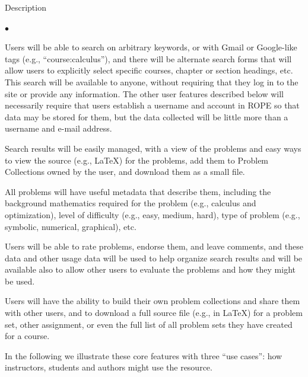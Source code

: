 \documentclass[11pt]{article}
\begin{document}
\begin{section}{Description}
\begin{list}{$\bullet$}{\setlength{\parsep}{0pt}\setlength{\itemsep}{0pt}}
  \item
    Users will be able to search on arbitrary keywords, or with Gmail or
    Google-like tags (e.g., ``course:calculus''), and there will be
    alternate search forms that will allow users to explicitly select
    specific courses, chapter or section headings, etc.  This search will
    be available to anyone, without requiring that they log in to the site
    or provide any information.  The other user features described below
    will necessarily require that users establish a username and account
    in ROPE so that data may be stored for them, but the data collected
    will be little more than a username and e-mail address.
  \item
    Search results will be easily managed, with a view of the problems and
    easy ways to view the source (e.g., \LaTeX) for the problems, add them
    to Problem Collections owned by the user, and download them as a small
    file.
  \item
    All problems will have useful metadata that describe them, including
    the background mathematics required for the problem (e.g., calculus
    and optimization), level of difficulty (e.g., easy, medium, hard),
    type of problem (e.g., symbolic, numerical, graphical), etc.
  \item
    Users will be able to rate problems, endorse them, and leave comments,
    and these data and other usage data will be used to help organize
    search results and will be available also to allow other users to
    evaluate the problems and how they might be used. 
  \item
    Users will have the ability to build their own problem collections and
    share them with other users, and to download a full source file (e.g.,
    in \LaTeX) for a problem set, other assignment, or even the full list
    of all problem sets they have created for a course. 
\end{list}

In the following we illustrate these core features with three ``use
cases'': how instructors, students and authors might use the resource.



\end{section}
\end{document}
